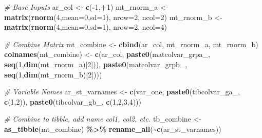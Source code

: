\documentclass[
]{book}
\newenvironment{Shaded}{\begin{snugshade}}{\end{snugshade}}
\newcommand{\CommentTok}[1]{\textcolor[rgb]{0.56,0.35,0.01}{\textit{#1}}}
\newcommand{\DataTypeTok}[1]{\textcolor[rgb]{0.13,0.29,0.53}{#1}}
\newcommand{\DecValTok}[1]{\textcolor[rgb]{0.00,0.00,0.81}{#1}}
\newcommand{\KeywordTok}[1]{\textcolor[rgb]{0.13,0.29,0.53}{\textbf{#1}}}
\newcommand{\NormalTok}[1]{#1}
\newcommand{\OperatorTok}[1]{\textcolor[rgb]{0.81,0.36,0.00}{\textbf{#1}}}
\newcommand{\StringTok}[1]{\textcolor[rgb]{0.31,0.60,0.02}{#1}}
\begin{document}
\begin{Shaded}
\begin{Highlighting}[]
\CommentTok{\# Base Inputs}
\NormalTok{ar\_col \textless{}{-}}\StringTok{ }\KeywordTok{c}\NormalTok{(}\OperatorTok{{-}}\DecValTok{1}\NormalTok{,}\OperatorTok{+}\DecValTok{1}\NormalTok{)}
\NormalTok{mt\_rnorm\_a \textless{}{-}}\StringTok{ }\KeywordTok{matrix}\NormalTok{(}\KeywordTok{rnorm}\NormalTok{(}\DecValTok{4}\NormalTok{,}\DataTypeTok{mean=}\DecValTok{0}\NormalTok{,}\DataTypeTok{sd=}\DecValTok{1}\NormalTok{), }\DataTypeTok{nrow=}\DecValTok{2}\NormalTok{, }\DataTypeTok{ncol=}\DecValTok{2}\NormalTok{)}
\NormalTok{mt\_rnorm\_b \textless{}{-}}\StringTok{ }\KeywordTok{matrix}\NormalTok{(}\KeywordTok{rnorm}\NormalTok{(}\DecValTok{4}\NormalTok{,}\DataTypeTok{mean=}\DecValTok{0}\NormalTok{,}\DataTypeTok{sd=}\DecValTok{1}\NormalTok{), }\DataTypeTok{nrow=}\DecValTok{2}\NormalTok{, }\DataTypeTok{ncol=}\DecValTok{4}\NormalTok{)}

\CommentTok{\# Combine Matrix}
\NormalTok{mt\_combine \textless{}{-}}\StringTok{ }\KeywordTok{cbind}\NormalTok{(ar\_col, mt\_rnorm\_a, mt\_rnorm\_b)}
\KeywordTok{colnames}\NormalTok{(mt\_combine) \textless{}{-}}\StringTok{ }\KeywordTok{c}\NormalTok{(}\StringTok{\textquotesingle{}ar\_col\textquotesingle{}}\NormalTok{,}
                          \KeywordTok{paste0}\NormalTok{(}\StringTok{\textquotesingle{}matcolvar\_grpa\_\textquotesingle{}}\NormalTok{, }\KeywordTok{seq}\NormalTok{(}\DecValTok{1}\NormalTok{,}\KeywordTok{dim}\NormalTok{(mt\_rnorm\_a)[}\DecValTok{2}\NormalTok{])),}
                          \KeywordTok{paste0}\NormalTok{(}\StringTok{\textquotesingle{}matcolvar\_grpb\_\textquotesingle{}}\NormalTok{, }\KeywordTok{seq}\NormalTok{(}\DecValTok{1}\NormalTok{,}\KeywordTok{dim}\NormalTok{(mt\_rnorm\_b)[}\DecValTok{2}\NormalTok{])))}

\CommentTok{\# Variable Names}
\NormalTok{ar\_st\_varnames \textless{}{-}}\StringTok{ }\KeywordTok{c}\NormalTok{(}\StringTok{\textquotesingle{}var\_one\textquotesingle{}}\NormalTok{,}
                    \KeywordTok{paste0}\NormalTok{(}\StringTok{\textquotesingle{}tibcolvar\_ga\_\textquotesingle{}}\NormalTok{, }\KeywordTok{c}\NormalTok{(}\DecValTok{1}\NormalTok{,}\DecValTok{2}\NormalTok{)),}
                    \KeywordTok{paste0}\NormalTok{(}\StringTok{\textquotesingle{}tibcolvar\_gb\_\textquotesingle{}}\NormalTok{, }\KeywordTok{c}\NormalTok{(}\DecValTok{1}\NormalTok{,}\DecValTok{2}\NormalTok{,}\DecValTok{3}\NormalTok{,}\DecValTok{4}\NormalTok{)))}

\CommentTok{\# Combine to tibble, add name col1, col2, etc.}
\NormalTok{tb\_combine \textless{}{-}}\StringTok{ }\KeywordTok{as\_tibble}\NormalTok{(mt\_combine) }\OperatorTok{\%\textgreater{}\%}\StringTok{ }\KeywordTok{rename\_all}\NormalTok{(}\OperatorTok{\textasciitilde{}}\KeywordTok{c}\NormalTok{(ar\_st\_varnames))}


\end{Highlighting}
\end{Shaded}
\end{document}
